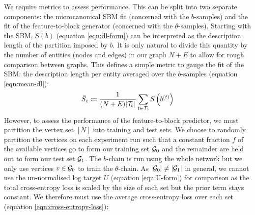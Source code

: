 \begin{table}[!h]
	\centering
	\caption{Experimental results averaged over $n=10$ iterations (mean $\pm$ standard deviation)}
	\label{tab:results}
\end{table}
%
We require metrics to assess performance. This can be split into two separate components: the microcanonical SBM fit (concerned with the $b$-samples) and the fit of the feature-to-block generator (concerned with the $\theta$-samples). Starting with the SBM, $S(b)$ (equation \ref{eqn:dl-form}) can be interpreted as the description length of the partition imposed by $b$. It is only natural to divide this quantity by the number of entities (nodes and edges) in our graph $N+E$ to allow for rough comparison between graphs. This defines a simple metric to gauge the fit of the SBM: the description length per entity averaged over the $b$-samples (equation \ref{eqn:mean-dl}):
%
\begin{equation}
	\bar{S}_e \coloneqq \frac{1}{(N+E) |\mathcal{T}_b|} \sum_{t\in \mathcal{T}_b} S \left( b^{(t)} \right)
	\label{eqn:mean-dl}
\end{equation}
%
However, to assess the performance of the feature-to-block predictor, we must partition the vertex set $[N]$ into training and test sets. We choose to randomly partition the vertices on each experiment run such that a constant fraction $f$ of the available vertices go to form our training set $\mathcal{G}_0$ and the remainder are held out to form our test set $\mathcal{G}_1$.
The $b$-chain is run using the whole network but we only use vertices $v \in \mathcal{G}_0$ to train the $\theta$-chain. As $|\mathcal{G}_0| \neq |\mathcal{G}_1|$ in general, we cannot use the un-normalised log target $U$ (equation \ref{eqn:U-form}) for comparison as the total cross-entropy loss is scaled by the size of each set but the prior term stays constant. We therefore must use the average cross-entropy loss over each set (equation \ref{eqn:cross-entropy-loss}):
